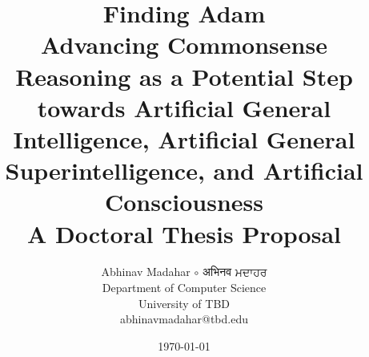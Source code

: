 \title{
    {\huge \textbf{Finding Adam}} \\
    Advancing Commonsense Reasoning as a Potential Step towards Artificial General Intelligence, Artificial General Superintelligence, and Artificial Consciousness
    \vspace{1cm} \\
    A Doctoral Thesis Proposal}

\author{
    Abhinav Madahar $\circ$ {\devanagari अभिनव } {\gurmukhi ਮਦਾਹਰ} \\
    Department of Computer Science \\
    University of TBD \\
    {\small abhinavmadahar@tbd.edu}}

\date{\today}
